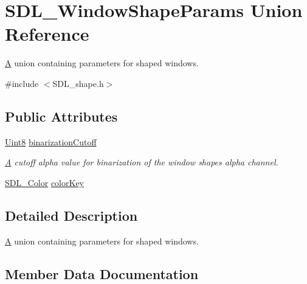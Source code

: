 \hypertarget{union_s_d_l___window_shape_params}{}\section{S\+D\+L\+\_\+\+Window\+Shape\+Params Union Reference}
\label{union_s_d_l___window_shape_params}


\mbox{\hyperlink{struct_a}{A}} union containing parameters for shaped windows.  




{\ttfamily \#include $<$S\+D\+L\+\_\+shape.\+h$>$}

\subsection*{Public Attributes}
\begin{DoxyCompactItemize}
\item 
\mbox{\hyperlink{_s_d_l__stdinc_8h_a2944638813a090aa23e62f4da842c3e2}{Uint8}} \mbox{\hyperlink{union_s_d_l___window_shape_params_a534c40b09588a8075c0a70227753dc56}{binarization\+Cutoff}}
\begin{DoxyCompactList}\small\item\em \mbox{\hyperlink{struct_a}{A}} cutoff alpha value for binarization of the window shape\textquotesingle{}s alpha channel. \end{DoxyCompactList}\item 
\mbox{\hyperlink{struct_s_d_l___color}{S\+D\+L\+\_\+\+Color}} \mbox{\hyperlink{union_s_d_l___window_shape_params_a8bf3e442a51a1bbf452cfec7c1ed5318}{color\+Key}}
\end{DoxyCompactItemize}


\subsection{Detailed Description}
\mbox{\hyperlink{struct_a}{A}} union containing parameters for shaped windows. 

\subsection{Member Data Documentation}
\mbox{\label{union_s_d_l___window_shape_params_a534c40b09588a8075c0a70227753dc56}} 
